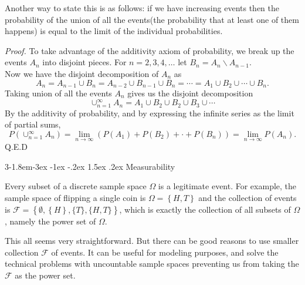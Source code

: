 \documentclass{tufte-handout}
\makeatletter
\renewcommand{\subsection}{\@startsection{subsection}%
    {3}{-1.8em}{-3ex \@plus -1ex \@minus -.2ex}%
    {1.5ex \@plus .2ex}
    {\hspace*{-5.5em}\fcolorbox{ltblue}{ltblue}{\parbox[c][1.0ex][b]{4em}{\phantom{space}}}
    \normalfont\large\itshape\color{ltblue}}}
\makeatother
\begin{document}
        Another way to state this is as follows: if we have increasing events then 
        the probability of the union 
        of all the events(the probability that at least one of them happens) is equal to
         the limit of the individual probabilities.\\


        \textit{Proof.} To take advantage of the additivity axiom of probability, we break up the events 
        $ A_n $ into disjoint pieces. For $ n=2,3,4,\dots $ let $ B_n = A_n \backslash A_{n-1} $.\\
        Now we have the disjoint decomposition of $ A_n  $ as 
        \[A_n=A_{n-1}\cup B_n = A_{n-2} \cup B_{n-1} \cup B_n = \cdots = A_1 \cup B_2 \cup \cdots \cup B_n.\]
        Taking union of all the events $ A_n $ gives us the disjoint decomposition
        \[\cup_{n=1}^{\infty}A_n=A_1 \cup B_2 \cup B_2 \cup B_3 \cup \cdots\]
        By the additivity of probability, and by expressing the infinite series as the limit of partial sums,
        \[P(\cup_{n=1}^{\infty}A_n)=\lim_{n \rightarrow \infty}(P(A_1)+P(B_2)+\cdot+P(B_{n}))=\lim_{n \rightarrow \infty}P(A_n).\]
        Q.E.D

    \subsection{Measurability}

        Every subset of a discrete sample space $ \Omega $ is a legitimate event. For example,
        the sample space of flipping a single coin is $ \Omega = \left\{H,T \right\}$ and the collection of 
        events is $ \mathcal{F} = \left\{\emptyset, \left\{H \right\}, \{T\}, \{H,T\}  \right\} $, which is 
        exactly the collection of all subsets of $ \Omega $, namely the power set of $ \Omega $.

        This all seems very straightforward. But there can be good reasons to use smaller collection $ \mathcal{F } $
         of events. It can be useful for modeling purposes, and solve the technical problems with uncountable sample spaces 
         preventing us from taking the $ \mathcal{F } $ as the power set.
\end{document}
